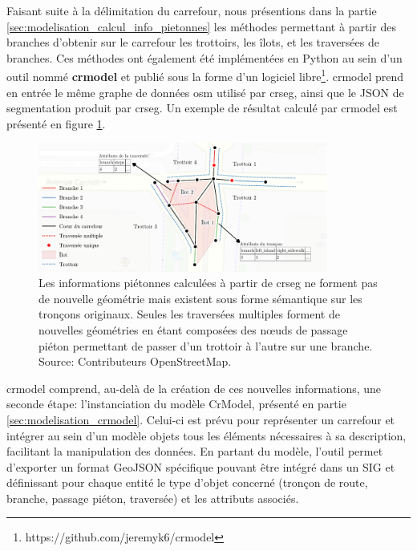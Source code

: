 \newpar{}

Faisant suite à la délimitation du carrefour, nous présentions dans la partie \ref{sec:modelisation_calcul_info_pietonnes} les méthodes permettant à partir des branches d'obtenir sur le carrefour les trottoirs, les îlots, et les traversées de branches. Ces méthodes ont également été implémentées en Python au sein d'un outil nommé \textbf{crmodel} et publié sous la forme d'un logiciel libre\footnote{https://github.com/jeremyk6/crmodel}. crmodel prend en entrée le même graphe de données \gls{osm} utilisé par crseg, ainsi que le JSON de segmentation produit par crseg. Un exemple de résultat calculé par crmodel est présenté en figure \ref{fig:experimentation_crmodel_info_pietonne}.

\begin{figure}[ht]
    \centering
    \includegraphics[width=0.85\textwidth]{images/experimentation/donnees_crmodel.pdf}
    \caption[Données produites par crmodel]{Les informations piétonnes calculées à partir de crseg ne forment pas de nouvelle géométrie mais existent sous forme sémantique sur les tronçons originaux. Seules les traversées multiples forment de nouvelles géométries en étant composées des nœuds de passage piéton permettant de passer d'un trottoir à l'autre sur une branche. Source: Contributeurs OpenStreetMap.}
    \label{fig:experimentation_crmodel_info_pietonne}
\end{figure}

\newpar{}

crmodel comprend, au-delà de la création de ces nouvelles informations, une seconde étape: l'instanciation du modèle CrModel, présenté en partie \ref{sec:modelisation_crmodel}. Celui-ci est prévu pour représenter un carrefour et intégrer au sein d'un modèle objets tous les éléments nécessaires à sa description, facilitant la manipulation des données. En partant du modèle, l'outil permet d'exporter un format GeoJSON spécifique pouvant être intégré dans un SIG et définissant pour chaque entité le type d'objet concerné (tronçon de route, branche, passage piéton, traversée) et les attributs associés.

